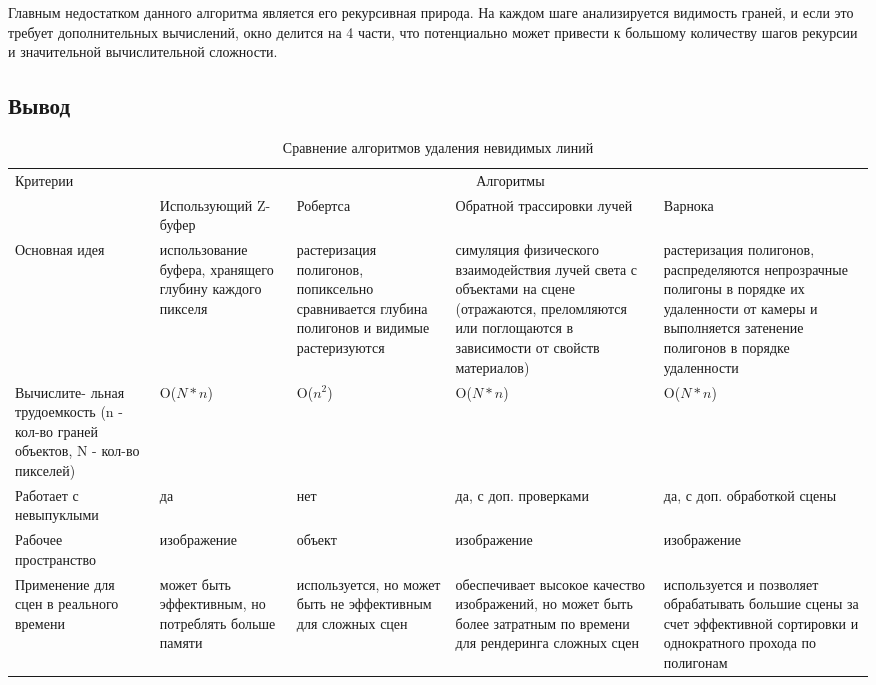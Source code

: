 Главным недостатком данного алгоритма является его рекурсивная природа. На каждом шаге анализируется видимость граней, и если это требует дополнительных вычислений, окно делится на 4 части, что потенциально может привести к большому количеству шагов рекурсии и значительной вычислительной сложности.


\subsection{Вывод}

\begin{table} [] 
	\caption{Сравнение алгоритмов удаления невидимых линий}
	\label{tbl:alg_del}
	\begin{tabular}{|p{}|p{}|p{}|p{}|p{}|}
		\hline
		\multirow{2}{*}{Критерии} & \multicolumn{4}{|c|}{Алгоритмы} \\
		\cline{2-5}
		& Использующий Z-буфер & Робертса & Обратной трассировки лучей & Варнока  \\
		\hline
		Основная идея & использование буфера, хранящего глубину каждого пикселя & растеризация полигонов, попиксельно сравнивается глубина полигонов и видимые растеризуются & симуляция физического взаимодействия лучей света с объектами на сцене (отражаются, преломляются или поглощаются в зависимости от свойств материалов) & растеризация полигонов, распределяются непрозрачные полигоны в порядке их удаленности от камеры и выполняется затенение полигонов в порядке удаленности \\
		\hline
		Вычислите-
		льная трудоемкость (n - кол-во граней объектов, N - кол-во пикселей)& O($N*n$) & O($n^2$) &  O($N*n$) & O($N*n$) \\		
		\hline
		Работает с невыпуклыми & да & нет & да, с доп. проверками & да, с доп. обработкой сцены\\
		\hline
		Рабочее пространство & изображение & объект & изображение & изображение \\ 
		\hline 
		Применение для сцен в реального времени & может быть эффективным, но потреблять больше памяти & используется, но может быть не эффективным для сложных сцен & обеспечивает высокое качество изображений, но может быть более затратным по времени для рендеринга сложных сцен & используется и позволяет обрабатывать большие сцены за счет эффективной сортировки и однократного прохода по полигонам \\
		\hline
	\end{tabular}
\end{table}


